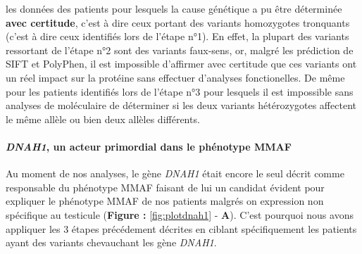 \documentclass[12pt,twoside]{reedthesis}
\theoremstyle{definition}
\theoremstyle{definition}
\theoremstyle{remark}
\begin{document}
\begin{enumerate}
    les données des patients pour lesquels la cause génétique a pu être
    déterminée \textbf{avec certitude}, c'est à dire ceux portant des
    variants homozygotes tronquants (c'est à dire ceux identifiés lors de
    l'étape n°1). En effet, la plupart des variants ressortant de l'étape
    n°2 sont des variants faux-sens, or, malgré les prédiction de SIFT et
    PolyPhen, il est impossible d'affirmer avec certitude que ces variants
    ont un réel impact sur la protéine sans effectuer d'analyses
    fonctionelles. De même pour les patients identifiés lors de l'étape
    n°3 pour lesquels il est impossible sans analyses de moléculaire de
    déterminer si les deux variants hétérozygotes affectent le même allèle
    ou bien deux allèles différents.\\
    \newpage  
  \end{enumerate}
  
  \paragraph{\texorpdfstring{\emph{DNAH1}, un acteur primordial dans le
  phénotype
  MMAF}{DNAH1, un acteur primordial dans le phénotype MMAF}}\label{dnah1-un-acteur-primordial-dans-le-phenotype-mmaf}
  
  Au moment de nos analyses, le gène \emph{DNAH1} était encore le seul
  décrit comme responsable du phénotype MMAF faisant de lui un candidat
  évident pour expliquer le phénotype MMAF de nos patients malgrés on
  expression non spécifique au testicule (\textbf{Figure :
  }\ref{fig:plotdnah1} - \textbf{A}). C'est pourquoi nous avons appliquer
  les 3 étapes précédement décrites en ciblant spécifiquement les patients
  ayant des variants chevauchant les gène \emph{DNAH1}.
  
\end{document}
